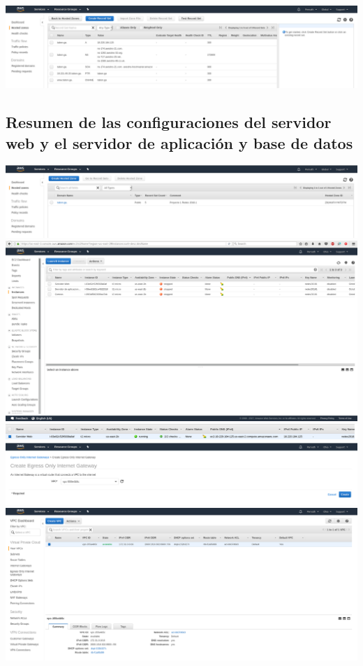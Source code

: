 \documentclass[9pt]{article}
\begin{document}
\includegraphics[width=\textwidth]{record_set}

\subsection*{Resumen de las configuraciones del servidor web y el servidor de aplicación y base de datos}
\includegraphics[width=\textwidth]{HostedZones}
\includegraphics[width=\textwidth]{instances_dashboard}
\includegraphics[width=\textwidth]{web_server}
\includegraphics[width=\textwidth]{egress_only_gateway}
\includegraphics[width=\textwidth]{vpc}
\end{document}
